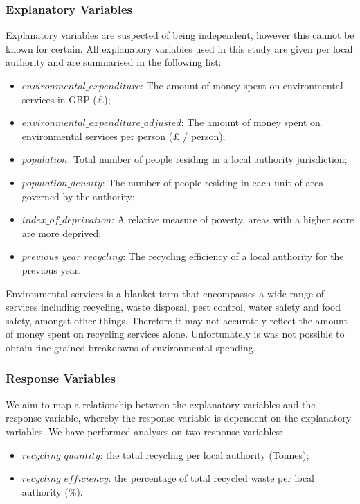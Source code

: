\documentclass[11pt,conference]{IEEEtran}
\begin{document}
\subsubsection{Explanatory Variables}
Explanatory variables are suspected of being independent, however this cannot be known for certain. All explanatory variables used in this study are given per local authority and are summarised in the following list:

\begin{itemize}
\item $environmental\_expenditure$: The amount of money spent on environmental services in GBP (£);
\item $environmental\_expenditure\_adjusted$: The amount of money spent on environmental services per person (£ / person);
\item $population$: Total number of people residing in a local authority jurisdiction;
\item $population\_density$: The number of people residing in each unit of area governed by the authority;
\item $index\_of\_deprivation$: A relative measure of poverty, areas with a higher score are more deprived;
\item $previous\_year\_recycling$: The recycling efficiency of a local authority for the previous year. 
\end{itemize}


Environmental services is a blanket term that encompasses a wide range of services including recycling, waste disposal, pest control, water safety and food safety, amongst other things. Therefore it may not accurately reflect the amount of money spent on recycling services alone. Unfortunately is was not possible to obtain fine-grained breakdowns of environmental spending.

\subsubsection{Response Variables}
We aim to map a relationship between the explanatory variables and the response variable, whereby the response variable is dependent on the explanatory variables. We have performed analyses on two response variables:

\begin{itemize}
\item $recycling\_quantity$: the total recycling per local authority (Tonnes);
\item $recycling\_efficiency$: the percentage of total recycled waste per local authority (\%).
\end{itemize}
\end{document}
